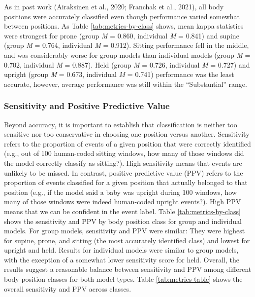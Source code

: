 \documentclass[
  man]{apa6}
\begin{document}
As in past work (Airaksinen et al., 2020; Franchak et al., 2021), all body positions were accurately classified even though performance varied somewhat between positions. As Table \ref{tab:metrics-by-class} shows, mean kappa statistics were strongest for prone (group \emph{M} = 0.860, individual \emph{M} = 0.841) and supine (group \emph{M} = 0.764, individual \emph{M} = 0.912). Sitting performance fell in the middle, and was considerably worse for group models than individual models (group \emph{M} = 0.702, individual \emph{M} = 0.887). Held (group \emph{M} = 0.726, individual \emph{M} = 0.727) and upright (group \emph{M} = 0.673, individual \emph{M} = 0.741) performance was the least accurate, however, average performance was still within the ``Substantial'' range.

\hypertarget{sensitivity-and-positive-predictive-value}{%
\subsubsection{Sensitivity and Positive Predictive Value}\label{sensitivity-and-positive-predictive-value}}

Beyond accuracy, it is important to establish that classification is neither too sensitive nor too conservative in choosing one position versus another. Sensitivity refers to the proportion of events of a given position that were correctly identified (e.g., out of 100 human-coded sitting windows, how many of those windows did the model correctly classify as sitting?). High sensitivity means that events are unlikely to be missed. In contrast, positive predictive value (PPV) refers to the proportion of events classified for a given position that actually belonged to that position (e.g., if the model said a baby was upright during 100 windows, how many of those windows were indeed human-coded upright events?). High PPV means that we can be confident in the event label. Table \ref{tab:metrics-by-class} shows the sensitivity and PPV by body position class for group and individual models. For group models, sensitivity and PPV were similar: They were highest for supine, prone, and sitting (the most accurately identified class) and lowest for upright and held. Results for individual models were similar to group models, with the exception of a somewhat lower sensitivity score for held. Overall, the results suggest a reasonable balance between sensitivity and PPV among different body position classes for both model types. Table \ref{tab:metrics-table} shows the overall sensitivity and PPV across classes.
\end{document}
